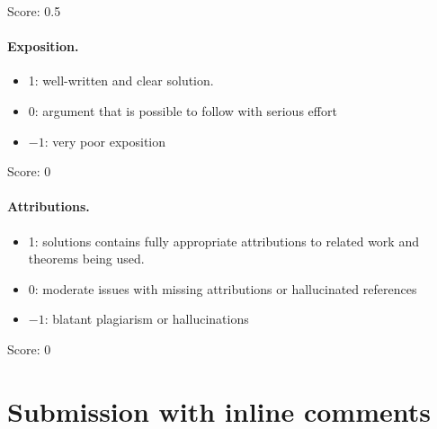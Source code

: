 \documentclass[11pt]{article}
\theoremstyle{remark}
\begin{document}
\noindent Score: 0.5

\paragraph{Exposition.}
\begin{itemize}
	\item  1: well-written and clear solution.
	\item  0: argument that is possible to follow with serious effort
	\item  $-1$: very poor exposition
\end{itemize}

\noindent Score: 0

\paragraph{Attributions.}
\begin{itemize}
	\item  1: solutions contains fully appropriate attributions
		to related work and theorems being used.
	\item  0: moderate issues with missing attributions or hallucinated references
	\item  $-1$: blatant plagiarism or hallucinations
\end{itemize}

\noindent Score: 0


\newpage
\section{Submission with inline comments}


\begin{abstract}
We give an explicit identification of the reduced stated
$\mathrm{SL}_n$-skein algebra of the once-punctured bigon with the
generalized quantum double of the two simply-connected quantum
Borel algebras.  The identification is specified on every horizontal
matrix-coefficient arc.   Its injectivity follows from an ordered
two-arc factorization of the skein algebra, rather than from a
comparison of defining relations alone.  The prescribed diagonal 
quotient then identifies the two Cartan tori and gives the
simply-connected quantized enveloping algebra.
\end{abstract}
\end{document}
